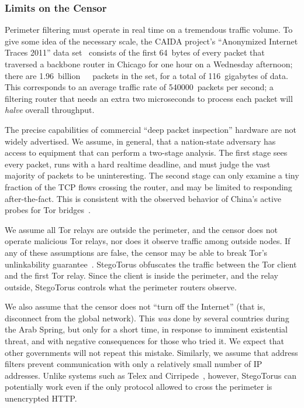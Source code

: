\subsubsection{Limits on the Censor}\label{s:limits-censor}

Perimeter filtering must operate in real time on a tremendous traffic
volume.  To give some idea of the necessary scale, the CAIDA project's
“Anonymized Internet Traces 2011” data set~\cite{d-caida} consists of
the first \SI{64}{bytes} of every packet that traversed a backbone
router in Chicago for one hour on a Wednesday afternoon; there are
\SI{1.96}{billion\ packets} in the set, for a total of
\SI{116}{gigabytes} of data.  This corresponds to an average traffic
rate of \SI{540000}{packets} per second; a filtering router that needs
an extra two microseconds to process each packet will \emph{halve}
overall throughput.

The precise capabilities of commercial “deep packet inspection”
hardware are not widely advertised.  We assume, in general, that a
nation-state adversary has access to equipment that can perform a
two-stage analysis.  The first stage sees every packet, runs with a
hard realtime deadline, and must judge the vast majority of packets to
be uninteresting.  The second stage can only examine a tiny fraction
of the TCP flows crossing the router, and may be limited to responding
after-the-fact.  This is consistent with the observed behavior of
China's active probes for Tor bridges~\cite{n-china-active}.

We assume all Tor relays are outside the perimeter, and the censor
does not operate malicious Tor relays, nor does it observe traffic
among outside nodes.  If any of these assumptions are false, the
censor may be able to break Tor's unlinkability
guarantee~\cite{a-serve-surf,a-tor}.  StegoTorus obfuscates the
traffic between the Tor client and the first Tor relay. Since
the client is inside the perimeter, and the relay outside, StegoTorus
controls what the perimeter routers observe.

We also assume that the censor does not “turn off the Internet” (that
is, disconnect from the global network).  This \emph{was} done by
several countries during the Arab Spring, but only for a short time,
in response to imminent existential threat, and with negative
consequences for those who tried it.  We expect that other governments
will not repeat this mistake.  Similarly, we assume that address
filters prevent communication with only a relatively small number of
IP addresses.  Unlike systems such as Telex and
Cirripede~\cite{c-cirripede}, however, StegoTorus can potentially work
even if the only protocol allowed to cross the perimeter is
unencrypted HTTP.

